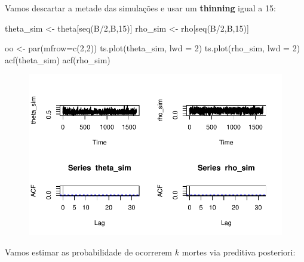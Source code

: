 \documentclass[
  letterpaper,
  DIV=11,
  numbers=noendperiod]{scrreprt}
\newenvironment{Shaded}{\begin{snugshade}}{\end{snugshade}}
\newcommand{\AttributeTok}[1]{\textcolor[rgb]{0.40,0.45,0.13}{#1}}
\newcommand{\DecValTok}[1]{\textcolor[rgb]{0.68,0.00,0.00}{#1}}
\newcommand{\FunctionTok}[1]{\textcolor[rgb]{0.28,0.35,0.67}{#1}}
\newcommand{\NormalTok}[1]{\textcolor[rgb]{0.00,0.23,0.31}{#1}}
\newcommand{\OtherTok}[1]{\textcolor[rgb]{0.00,0.23,0.31}{#1}}
\newcommand{\SpecialCharTok}[1]{\textcolor[rgb]{0.37,0.37,0.37}{#1}}
\theoremstyle{definition}
\theoremstyle{definition}
\theoremstyle{remark}
\begin{document}
Vamos descartar a metade das simulações e usar um \textbf{thinning}
igual a 15:

\begin{Shaded}
\begin{Highlighting}[]
\NormalTok{theta\_sim }\OtherTok{\textless{}{-}}\NormalTok{ theta[}\FunctionTok{seq}\NormalTok{(B}\SpecialCharTok{/}\DecValTok{2}\NormalTok{,B,}\DecValTok{15}\NormalTok{)]}
\NormalTok{rho\_sim }\OtherTok{\textless{}{-}}\NormalTok{ rho[}\FunctionTok{seq}\NormalTok{(B}\SpecialCharTok{/}\DecValTok{2}\NormalTok{,B,}\DecValTok{15}\NormalTok{)]}

\NormalTok{oo }\OtherTok{\textless{}{-}} \FunctionTok{par}\NormalTok{(}\AttributeTok{mfrow=}\FunctionTok{c}\NormalTok{(}\DecValTok{2}\NormalTok{,}\DecValTok{2}\NormalTok{))}
\FunctionTok{ts.plot}\NormalTok{(theta\_sim, }\AttributeTok{lwd =} \DecValTok{2}\NormalTok{)}
\FunctionTok{ts.plot}\NormalTok{(rho\_sim, }\AttributeTok{lwd =} \DecValTok{2}\NormalTok{)}
\FunctionTok{acf}\NormalTok{(theta\_sim)}
\FunctionTok{acf}\NormalTok{(rho\_sim)}
\end{Highlighting}
\end{Shaded}

\begin{figure}[H]

{\centering \includegraphics{misturas_files/figure-pdf/unnamed-chunk-4-1.pdf}

}

\end{figure}

Vamos estimar as probabilidade de ocorrerem \(k\) mortes via preditiva
posteriori:
\end{document}
